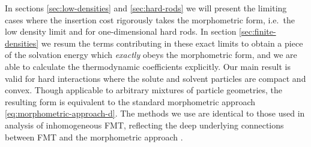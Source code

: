 \documentclass[11pt,twoside]{report}
\begin{document}


In sections \ref{sec:low-densities} and \ref{sec:hard-rods} we will present the limiting cases where the insertion cost rigorously takes the morphometric form, i.e.\ the low density limit and for one-dimensional hard rods.
In section \ref{sec:finite-densities} we resum the terms contributing in these exact limits to obtain a piece of the solvation energy which \emph{exactly} obeys the morphometric form, and we are able to calculate the thermodynamic coefficients explicitly.
Our main result is valid for hard interactions where the solute and solvent particles are compact and convex.
Though applicable to arbitrary mixtures of particle geometries, the resulting form is equivalent to the standard morphometric approach \eqref{eq:morphometric-approach-d}.
The methods we use are identical to those used in analysis of inhomogeneous FMT, reflecting the deep underlying connections between FMT and the morphometric approach \cite{LeithallPRE2011,KordenPRE2012,MarechalPRE2014}.

\end{document}
